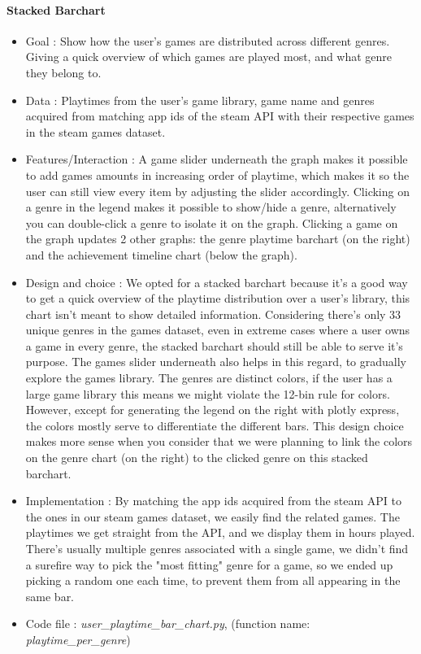 \documentclass{article}
\begin{document}
        \paragraph{Stacked Barchart}
        \begin{itemize}
           \item Goal : Show how the user's games are distributed across different genres. Giving a quick overview of which games are played most, and what genre they belong to.
           \item Data : Playtimes from the user's game library, game name and genres acquired from matching app ids of the steam API with their respective games in the steam games dataset.
           \item Features/Interaction : A game slider underneath the graph makes it possible to add games amounts in increasing order of playtime, which makes it so the user can still view every item by adjusting the slider accordingly. Clicking on a genre in the legend makes it possible to show/hide a genre, alternatively you can double-click a genre to isolate it on the graph. Clicking a game on the graph updates 2 other graphs: the genre playtime barchart (on the right) and the achievement timeline chart (below the graph).
           \item Design and choice : We opted for a stacked barchart because it's a good way to get a quick overview of the playtime distribution over a user's library, this chart isn't meant to show detailed information. Considering there's only 33 unique genres in the games dataset, even in extreme cases where a user owns a game in every genre, the stacked barchart should still be able to serve it's purpose. The games slider underneath also helps in this regard, to gradually explore the games library. The genres are distinct colors, if the user has a large game library this means we might violate the 12-bin rule for colors. However, except for generating the legend on the right with plotly express, the colors mostly serve to differentiate the different bars. This design choice makes more sense when you consider that we were planning to link the colors on the genre chart (on the right) to the clicked genre on this stacked barchart. 
           \item Implementation : By matching the app ids acquired from the steam API to the ones in our steam games dataset, we easily find the related games. The playtimes we get straight from the API, and we display them in hours played. There's usually multiple genres associated with a single game, we didn't find a surefire way to pick the "most fitting" genre for a game, so we ended up picking a random one each time, to prevent them from all appearing in the same bar. 
           \item Code file : \textit{user\_playtime\_bar\_chart.py}, (function name: \textit{playtime\_per\_genre})
        \end{itemize}
        
\end{document}
